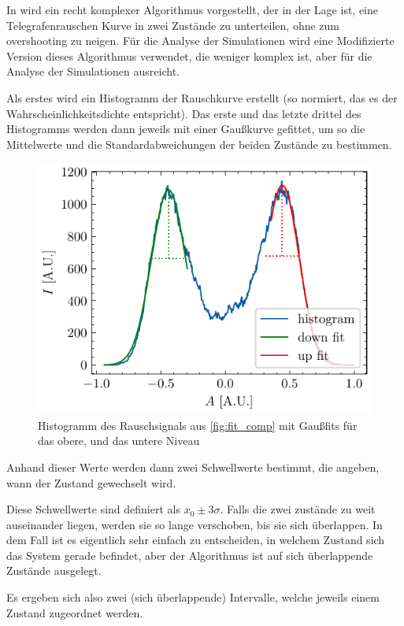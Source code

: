 \documentclass[main.tex]{subfiles}
\begin{document}
In \cite{random-telegraph-analysis} wird ein recht komplexer Algorithmus vorgestellt, der in der Lage ist, eine Telegrafenrauschen Kurve in zwei Zustände zu unterteilen, ohne zum overshooting zu neigen. Für die Analyse der Simulationen wird eine Modifizierte Version dieses Algorithmus verwendet, die weniger komplex ist, aber für die Analyse der Simulationen ausreicht.


Als erstes wird ein Histogramm der Rauschkurve erstellt (so normiert, das es der Wahrscheinlichkeitsdichte entspricht). 
Das erste und das letzte drittel des Histogramms werden dann jeweils mit einer Gaußkurve gefittet, um so die Mittelwerte und die Standardabweichungen der beiden Zustände zu bestimmen.

\begin{figure}[h]
    \centering
    \includegraphics{bilder/plots/theo-vis/hist_fit.pdf}
    \caption{Histogramm des Rauschsignals aus \cref{fig:fit_comp} mit Gaußfits für das obere, und das untere Niveau}
\end{figure}

Anhand dieser Werte werden dann zwei Schwellwerte bestimmt, die angeben, wann der Zustand gewechselt wird.

Diese Schwellwerte sind definiert als \(x_0 \pm 3\sigma\). Falls die zwei zustände zu weit auseinander liegen, werden sie so lange verschoben, bis sie sich überlappen. 
In dem Fall ist es eigentlich sehr einfach zu entscheiden, in welchem Zustand sich das System gerade befindet, aber der Algorithmus ist auf sich überlappende Zustände ausgelegt.

Es ergeben sich also zwei (sich überlappende) Intervalle, welche jeweils einem Zustand zugeordnet werden.
\end{document}
